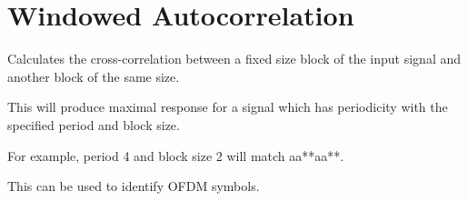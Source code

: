 \section{Windowed Autocorrelation}

Calculates the cross-correlation between a fixed size block of the input signal and another block of the same size.

This will produce maximal response for a signal which has periodicity with the specified period and block size.

For example, period 4 and block size 2 will match aa**aa**.

This can be used to identify OFDM symbols.
